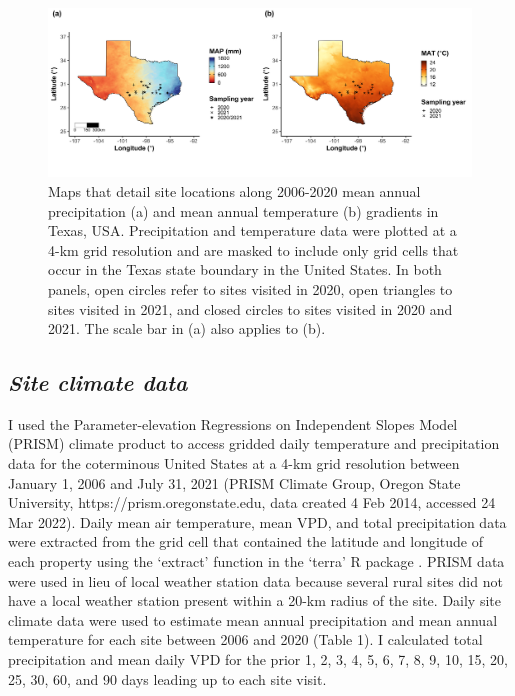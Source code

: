 \newpage
\begin{landscape}
    \begin{figure}
        \centering
        \includegraphics[scale = 0.049]{ch4_TXeco/figs/TXeco_fig1_site_map.png}
        \caption[Maps that detail site locations along 2006-2020 mean annual precipitation and mean annual temperature gradients in Texas, USA.]{Maps that detail site locations along 2006-2020 mean annual precipitation (a) and mean annual temperature (b) gradients in Texas, USA. Precipitation and temperature data were plotted at a 4-km grid resolution and are masked to include only grid cells that occur in the Texas state boundary in the United States. In both panels, open circles refer to sites visited in 2020, open triangles to sites visited in 2021, and closed circles to sites visited in 2020 and 2021. The scale bar in (a) also applies to (b).}
        \label{fig:figure4.1}
    \end{figure}
\end{landscape}
\clearpage

\subsection{\textit{Site climate data}}
\noindent I used the Parameter-elevation Regressions on Independent Slopes Model (PRISM)  climate product to access gridded daily temperature and precipitation data for the coterminous United States at a 4-km grid resolution between January 1, 2006 and July 31, 2021 (PRISM Climate Group, Oregon State University, https://prism.oregonstate.edu, data created 4 Feb 2014, accessed 24 Mar 2022). Daily mean air temperature, mean VPD, and total precipitation data were extracted from the grid cell that contained the latitude and longitude of each property using the ‘extract’ function in the ‘terra’ R package . PRISM data were used in lieu of local weather station data because several rural sites did not have a local weather station present within a 20-km radius of the site. Daily site climate data were used to estimate mean annual precipitation and mean annual temperature for each site between 2006 and 2020 (Table 1). I calculated total precipitation and mean daily VPD for the prior 1, 2, 3, 4, 5, 6, 7, 8, 9, 10, 15, 20, 25, 30, 60, and 90 days leading up to each site visit.

